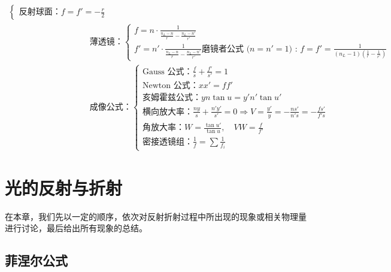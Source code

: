 \documentclass[UTF8]{report}
\theoremstyle{MyLineTheoremStyle} %
\theoremstyle{MyBlockTheoremStyle} %
\theoremstyle{MySubsubsectionStyle} %
\begin{document}
\begin{align}
\begin{cases}
    \text{反射球面：}f = f' = - \frac{r}{2}
\end{cases}
\\ &
\text{薄透镜：}
\begin{cases}
    f = n \cdot \frac{1}{\frac{n_L - n}{r} - \frac{n_L - n'}{r'}} \\ 
    f' = n' \cdot \frac{1}{\frac{n_L - n}{r} - \frac{n_L - n'}{r'}}
    \text{磨镜者公式 ($n = n' = 1$) : }f = f' = \frac{1}{\left(n_L - 1\right)\left(\frac{1}{r} - \frac{1}{r'}\right)}
\end{cases}
\\ &
\text{成像公式：}
\begin{cases}
    \text{Gauss 公式：} \frac{f}{s} + \frac{f'}{s'} = 1 \\ 
    \text{Newton 公式：} xx' = ff'\\
    \text{亥姆霍兹公式：} yn \tan u = y'n' \tan u'\\
    \text{横向放大率：} \frac{ny}{s} + \frac{n'y'}{s'} = 0 \Longrightarrow V = \frac{y'}{y} =  - \frac{ns'}{n's}=  - \frac{fs'}{f's}\\
    \text{角放大率：} W = \frac{\tan u'}{\tan u},\quad VW = \frac{f}{f'}\\
    \text{密接透镜组：} \frac{1}{f} = \sum \frac{1}{f_i}
\end{cases}
\end{align}



\chapter{光的反射与折射}\thispagestyle{fancy}

在本章，我们先以一定的顺序，依次对反射折射过程中所出现的现象或相关物理量进行讨论，最后给出所有现象的总结。

\section{菲涅尔公式}
\end{document}
